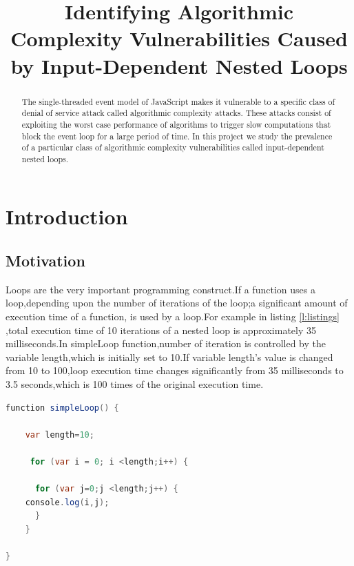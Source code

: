 \documentclass[authoryear,preprint]{sigplanconf}
\begin{document}
\setlength{\pdfpageheight}{\paperheight}
\setlength{\pdfpagewidth}{\paperwidth}


\title{Identifying Algorithmic Complexity Vulnerabilities Caused by
Input-Dependent Nested Loops}

\maketitle

\begin{abstract}
The single-threaded event model of JavaScript makes it vulnerable to a specific class of denial of
service attack called algorithmic complexity attacks. These attacks consist of exploiting the worst
case performance of algorithms to trigger slow computations that block the event loop for a large
period of time. In this project we study the prevalence of a particular class of algorithmic complexity
vulnerabilities called input-dependent nested loops.
\end{abstract}

\section{Introduction}
\label{sec:introduction}
\subsection{Motivation}
\label{subsec:motivation}
Loops are the very important programming construct.If a function uses a loop,depending upon the number of  iterations of the loop;a significant amount of execution time of a function, is used by a loop.For example
in listing \ref{l:listings} ,total execution time of 10 iterations of a nested loop is approximately 35 milliseconds.In simpleLoop function,number of iteration is controlled by the variable length,which is initially set to 10.If variable length's value is changed from 10 to 100,loop execution time changes significantly from 35 milliseconds to 3.5 seconds,which is 100 times of the original execution time.
\lstset{numbers=left, numberstyle=\tiny, stepnumber=1, numbersep=5pt}
\lstset{basicstyle=\ttfamily}
\lstset{frame=tb}

\begin{lstlisting}[caption=Simple nested loop,label=l:listings,language=Java]
function simpleLoop() {
	
	var length=10;

     for (var i = 0; i <length;i++) {

      for (var j=0;j <length;j++) {
   	console.log(i,j);
      }
    }
 
}
\end{lstlisting}
\end{document}
